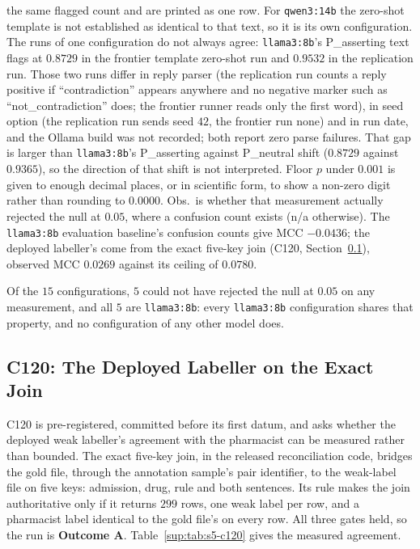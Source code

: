 \begin{table}[H]
{the same flagged count and are printed as one row. For
\texttt{qwen3:14b} the zero-shot template is not established as identical to
that text, so it is its own configuration. The runs of one configuration do not
always agree: \texttt{llama3:8b}'s P\_asserting text flags at $0.8729$ in the
frontier template zero-shot run and $0.9532$ in the replication run. Those two runs
differ in reply parser (the replication run counts a reply positive if
``contradiction'' appears anywhere and no negative marker such as
``not\_contradiction'' does; the
frontier runner reads only the first word), in seed option (the replication
run sends seed $42$, the frontier run none) and in run date, and the Ollama
build was not recorded; both report zero parse failures. That gap is larger
than \texttt{llama3:8b}'s P\_asserting against P\_neutral shift ($0.8729$
against $0.9365$), so the direction of that shift is not interpreted. Floor $p$ under $0.001$ is given to
enough decimal places, or in scientific form, to show a non-zero digit rather
than rounding to $0.0000$. Obs.\ is whether that measurement actually rejected
the null at $0.05$, where a confusion count exists (n/a otherwise). The
\texttt{llama3:8b} evaluation baseline's confusion counts give MCC $-0.0436$; the deployed
labeller's come from the exact five-key join (C120, Section~\ref{sup:sec:s5-c120}), observed MCC
$0.0269$ against its ceiling of $0.0780$.}
\label{sup:tab:s5-feasgate}
\end{table}

Of the $15$ configurations, $5$ could not have rejected the null at $0.05$ on
any measurement, and all $5$ are \texttt{llama3:8b}: every \texttt{llama3:8b}
configuration shares that property, and no configuration of any other model
does.

\subsection{C120: The Deployed Labeller on the Exact Join}
\label{sup:sec:s5-c120}

C120 is pre-registered, committed before its first datum, and asks whether the deployed weak
labeller's agreement with the pharmacist can be measured rather than bounded. The exact five-key
join, in the released reconciliation code, bridges the gold file, through the annotation
sample's pair identifier, to the weak-label file on five keys: admission, drug, rule and both
sentences. Its rule makes the join authoritative only if it
returns $299$ rows, one weak label per row, and a pharmacist label identical to the gold file's on
every row. All three gates held, so the run is \textbf{Outcome A}.
Table~\ref{sup:tab:s5-c120} gives the measured agreement.

